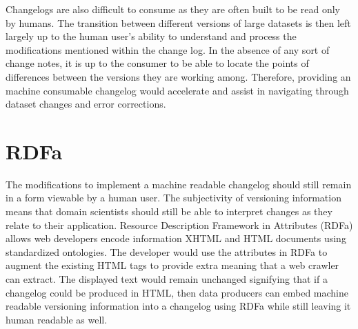 Changelogs are also difficult to consume as they are often built to be read only by humans.
The transition between different versions of large datasets is then left largely up to the human user's ability to understand and process the modifications mentioned within the change log.
In the absence of any sort of change notes, it is up to the consumer to be able to locate the points of differences between the versions they are working among.
Therefore, providing an machine consumable changelog would accelerate and assist in navigating through dataset changes and error corrections.

\section{RDFa}

The modifications to implement a machine readable changelog should still remain in a form viewable by a human user.
The subjectivity of versioning information means that domain scientists should still be able to interpret changes as they relate to their application.
Resource Description Framework in Attributes (RDFa) allows web developers encode information XHTML and HTML documents using standardized ontologies.
The developer would use the attributes in RDFa to augment the existing HTML tags to provide extra meaning that a web crawler can extract.
The displayed text would remain unchanged signifying that if a changelog could be produced in HTML, then data producers can embed machine readable versioning information into a changelog using RDFa while still leaving it human readable as well.


